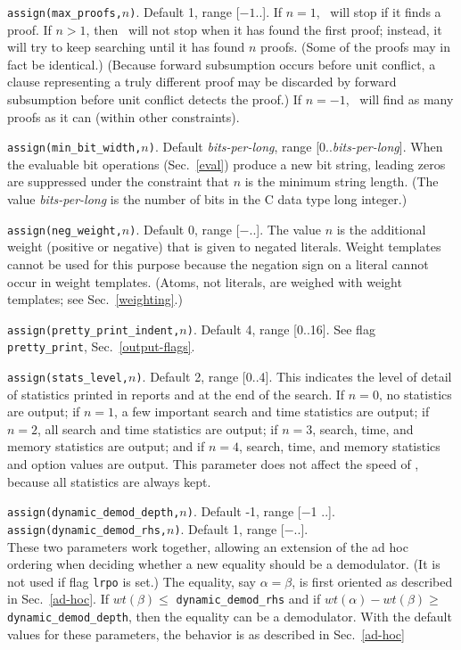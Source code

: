 \documentclass[11pt]{article}
\begin{document}
\noindent
\verb:assign(max_proofs,:$n$\verb:):.  Default 1, range [$-1$..\maxint ].  If $n = 1$,
\otter\ will stop if it finds a proof.  If $n > 1$, then
\otter\ will not stop when it has found the first proof; instead, it
will try to keep searching until it has found $n$ proofs.  (Some of
the proofs may in fact be identical.)  (Because forward
subsumption occurs before unit conflict, a clause representing a truly
different proof may be discarded by forward subsumption before unit
conflict detects the proof.)  If $n = -1$, \otter\ will find as
many proofs as it can (within other constraints).

\noindent
\verb:assign(min_bit_width,:$n$\verb:):.  Default {\em bits-per-long}, range [0..{\em bits-per-long}].
When the evaluable bit operations (Sec.~\ref{eval}) produce a new bit
string, leading zeros are suppressed under the constraint that
$n$ is the minimum string length.
(The value \emph{bits-per-long} is the number of bits in
the C data type long integer.)

\noindent
\verb:assign(neg_weight,:$n$\verb:):.  Default 0, range [$-$\maxint ..\maxint ].
The value
$n$ is the additional weight (positive or negative) that is given to
negated literals.  Weight templates cannot be used for this purpose
because the negation sign on a literal cannot occur in weight
templates.  (Atoms, not literals, are weighed with weight templates;
see Sec.~\ref{weighting}.)

\noindent
\verb:assign(pretty_print_indent,:$n$\verb:):.  Default 4, range [0..16].
See flag \verb:pretty_print:, Sec.~\ref{output-flags}.

\noindent
\verb:assign(stats_level,:$n$\verb:):.  Default 2, range [0..4].
This indicates the level of detail of statistics printed in reports and at
the end of the search.
If $n = 0$, no statistics are output;
if $n = 1$, a few important search and time statistics are output;
if $n = 2$, all search and time statistics are output;
if $n = 3$, search, time, and memory statistics are output; and
if $n = 4$, search, time, and memory statistics and option values are output.
This parameter does not affect the speed of \otter, because all
statistics are always kept.

\noindent
\verb:assign(dynamic_demod_depth,:$n$\verb:):.  Default -1, range [$-$1 ..\maxint ].\\
\verb:assign(dynamic_demod_rhs,:$n$\verb:):.  Default  1, range [$-$\maxint ..\maxint ].\\
These two parameters work together,
allowing an extension of the ad hoc ordering when
deciding whether a new equality should be a demodulator.  (It is
not used if flag \verb:lrpo: is set.)  The equality, say $\alpha=\beta$,
is first oriented as described in Sec.~\ref{ad-hoc}.
If $wt(\beta)\leq$
\verb:dynamic_demod_rhs: and if $wt(\alpha) - wt(\beta) \geq$
\verb:dynamic_demod_depth:, then the equality can be a demodulator.
With the default values for these parameters, the behavior
is as described in Sec.~\ref{ad-hoc}
\end{document}
